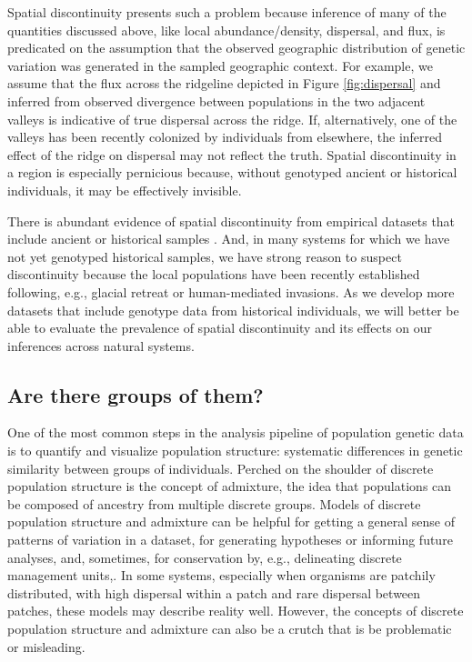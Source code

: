 \documentclass{ar-1col}
\newcommand{\todo}[1]{{\textbf{\color{red}{#1}}}}
\begin{document}
Spatial discontinuity presents such a problem because 
inference of many of the quantities discussed above, 
like local abundance/density, dispersal, and flux, 
is predicated on the assumption that 
the observed geographic distribution of genetic variation 
was generated in the sampled geographic context.
For example, 
we assume that the flux across the ridgeline 
depicted in Figure \ref{fig:dispersal}
and inferred from observed divergence 
between populations in the two adjacent valleys 
is indicative of true dispersal across the ridge.
If, alternatively, one of the valleys 
has been recently colonized by individuals from elsewhere, 
the inferred effect of the ridge on dispersal may not reflect the truth.
Spatial discontinuity in a region is especially pernicious because, 
without genotyped ancient or historical individuals, 
it may be effectively invisible.

There is abundant evidence of spatial discontinuity 
from empirical datasets that include ancient or historical samples 
\citep{bi2013unlocking, PickrellReich2014, lazaridis_ancient_2014, haak2015massive, allentoft2015population, joseph2018inference}.
And, in many systems for which we have not yet genotyped historical samples, 
we have strong reason to suspect discontinuity 
because the local populations have been recently established 
following, e.g., glacial retreat or human-mediated invasions.
As we develop more datasets that include genotype data from historical individuals, 
we will better be able to evaluate the prevalence of spatial discontinuity 
and its effects on our inferences across natural systems. 

\todo{read through and edit}

\subsection{Are there groups of them?}
One of the most common steps in the analysis pipeline of population genetic data
is to quantify and visualize population structure:
systematic differences in genetic similarity between groups of individuals.
Perched on the shoulder of discrete population structure is the concept of admixture,
the idea that populations can be composed of ancestry from multiple discrete groups.
Models of discrete population structure and admixture 
can be helpful for getting a general sense of patterns of variation in a dataset, 
for generating hypotheses or informing future analyses, 
and, sometimes, for conservation by, 
e.g., delineating discrete management units,.
In some systems, 
especially when organisms are patchily distributed, 
with high dispersal within a patch and rare dispersal between patches,
these models may describe reality well.
However, 
the concepts of discrete population structure and admixture 
can also be a crutch that is be problematic or misleading.
\end{document}
